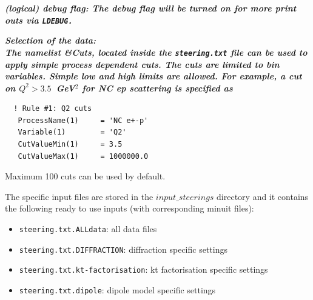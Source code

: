 \begin{description}
\begin{description}
\item \it\bf (logical) debug flag:\rm
 The debug flag will be turned on for more print outs via \tt LDEBUG. \rm

\item \it\bf Selection of the data:\rm \\
  The namelist \&Cuts, located inside the {\tt steering.txt} file can be used to apply
  simple process dependent cuts. The cuts are limited to bin variables.
  Simple low and high limits are allowed. For example, a cut on $Q^2>3.5$~GeV$^2$ for
  NC ep scattering is specified as

\begin{verbatim}
  ! Rule #1: Q2 cuts
   ProcessName(1)     = 'NC e+-p'
   Variable(1)        = 'Q2'
   CutValueMin(1)     = 3.5 
   CutValueMax(1)     = 1000000.0
\end{verbatim}

Maximum 100 cuts can be used by default.
\end{description}



The specific input files are stored in the {\tt $input\_steerings$} directory and 
it contains the following ready to use inputs (with corresponding minuit files):

\begin{itemize}
\item  {\tt steering.txt.ALLdata}: all data files 
\item  {\tt steering.txt.DIFFRACTION}: diffraction specific settings 
\item  {\tt steering.txt.kt-factorisation}: kt factorisation specific settings
\item  {\tt steering.txt.dipole}: dipole model specific settings  
\end{itemize}




\end{description}

